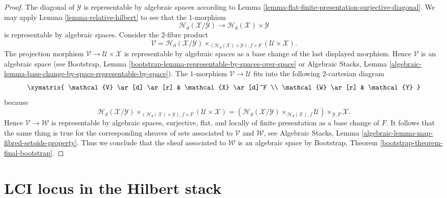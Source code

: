 \begin{proof}
\medskip\noindent
The diagonal of $\mathcal{Y}$ is representable by algebraic spaces according to
Lemma \ref{lemma-flat-finite-presentation-surjective-diagonal}.
We may apply
Lemma \ref{lemma-relative-hilbert}
to see that the $1$-morphism
$$
\mathcal{H}_d(\mathcal{X}/\mathcal{Y})
\longrightarrow
\mathcal{H}_d(\mathcal{X}) \times \mathcal{Y}
$$
is representable by algebraic spaces. Consider the $2$-fibre product
$$
\mathcal{V} =
\mathcal{H}_d(\mathcal{X}/\mathcal{Y})
\times_{(\mathcal{H}_d(\mathcal{X}) \times \mathcal{Y}), f \times F}
(\mathcal{U} \times \mathcal{X}).
$$
The projection morphism $\mathcal{V} \to \mathcal{U} \times \mathcal{X}$
is representable by algebraic spaces as a base change of the last
displayed morphism. Hence $\mathcal{V}$ is an algebraic space (see
Bootstrap, Lemma \ref{bootstrap-lemma-representable-by-spaces-over-space}
or
Algebraic Stacks,
Lemma \ref{algebraic-lemma-base-change-by-space-representable-by-space}).
The $1$-morphism $\mathcal{V} \to \mathcal{U}$ fits into the following
$2$-cartesian diagram
$$
\xymatrix{
\mathcal{V} \ar[d] \ar[r] & \mathcal{X} \ar[d]^F \\
\mathcal{W} \ar[r] & \mathcal{Y}
}
$$
because
$$
\mathcal{H}_d(\mathcal{X}/\mathcal{Y})
\times_{(\mathcal{H}_d(\mathcal{X}) \times \mathcal{Y}), f \times F}
(\mathcal{U} \times \mathcal{X})
=
(\mathcal{H}_d(\mathcal{X}/\mathcal{Y})
\times_{\mathcal{H}_d(\mathcal{X}), f}
\mathcal{U}) \times_{\mathcal{Y}, F} \mathcal{X}.
$$
Hence $\mathcal{V} \to \mathcal{W}$ is representable by algebraic spaces,
surjective, flat, and locally of finite presentation as a base change
of $F$. It follows that the same thing is true for the corresponding
sheaves of sets associated to $\mathcal{V}$ and $\mathcal{W}$, see
Algebraic Stacks, Lemma \ref{algebraic-lemma-map-fibred-setoids-property}.
Thus we conclude that the sheaf associated to $\mathcal{W}$ is an
algebraic space by
Bootstrap, Theorem \ref{bootstrap-theorem-final-bootstrap}.
\end{proof}




\section{LCI locus in the Hilbert stack}
\label{section-lci}

